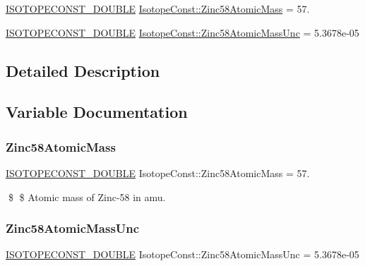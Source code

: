 \begin{DoxyCompactItemize}
\item 
\mbox{\hyperlink{group___isotope_const-_macros_ga8f45a7272ce02c0b4c65c44636ed719a}{I\+S\+O\+T\+O\+P\+E\+C\+O\+N\+S\+T\+\_\+\+D\+O\+U\+B\+LE}} \mbox{\hyperlink{group___isotope_const-_zinc-_zn58_ga54397e77b4b64dd2ac7a10079f983ab4}{Isotope\+Const\+::\+Zinc58\+Atomic\+Mass}} = 57.
\item 
\mbox{\hyperlink{group___isotope_const-_macros_ga8f45a7272ce02c0b4c65c44636ed719a}{I\+S\+O\+T\+O\+P\+E\+C\+O\+N\+S\+T\+\_\+\+D\+O\+U\+B\+LE}} \mbox{\hyperlink{group___isotope_const-_zinc-_zn58_ga48da51992a386fba7a0cefd3e86b7eee}{Isotope\+Const\+::\+Zinc58\+Atomic\+Mass\+Unc}} = 5.\+3678e-\/05
\end{DoxyCompactItemize}


\subsection{Detailed Description}


\subsection{Variable Documentation}
\mbox{\label{group___isotope_const-_zinc-_zn58_ga54397e77b4b64dd2ac7a10079f983ab4}} 
\subsubsection{\texorpdfstring{Zinc58\+Atomic\+Mass}{Zinc58AtomicMass}}
{\footnotesize\ttfamily \mbox{\hyperlink{group___isotope_const-_macros_ga8f45a7272ce02c0b4c65c44636ed719a}{I\+S\+O\+T\+O\+P\+E\+C\+O\+N\+S\+T\+\_\+\+D\+O\+U\+B\+LE}} Isotope\+Const\+::\+Zinc58\+Atomic\+Mass = 57.}

\$ \$ Atomic mass of Zinc-\/58 in amu. \mbox{\label{group___isotope_const-_zinc-_zn58_ga48da51992a386fba7a0cefd3e86b7eee}} 
\subsubsection{\texorpdfstring{Zinc58\+Atomic\+Mass\+Unc}{Zinc58AtomicMassUnc}}
{\footnotesize\ttfamily \mbox{\hyperlink{group___isotope_const-_macros_ga8f45a7272ce02c0b4c65c44636ed719a}{I\+S\+O\+T\+O\+P\+E\+C\+O\+N\+S\+T\+\_\+\+D\+O\+U\+B\+LE}} Isotope\+Const\+::\+Zinc58\+Atomic\+Mass\+Unc = 5.\+3678e-\/05}

